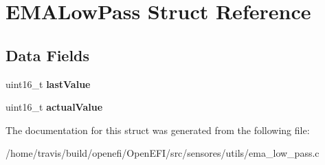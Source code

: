 \hypertarget{structEMALowPass}{}\section{E\+M\+A\+Low\+Pass Struct Reference}
\label{structEMALowPass}
\subsection*{Data Fields}
\begin{DoxyCompactItemize}
\item 
uint16\+\_\+t {\bfseries last\+Value}\hypertarget{structEMALowPass_a73f50a2d936f1cb4f1fbdd7e71fce863}{}\label{structEMALowPass_a73f50a2d936f1cb4f1fbdd7e71fce863}

\item 
uint16\+\_\+t {\bfseries actual\+Value}\hypertarget{structEMALowPass_a7747b0ecc32c8720e49bb2ca9247735b}{}\label{structEMALowPass_a7747b0ecc32c8720e49bb2ca9247735b}

\end{DoxyCompactItemize}


The documentation for this struct was generated from the following file\+:\begin{DoxyCompactItemize}
\item 
/home/travis/build/openefi/\+Open\+E\+F\+I/src/sensores/utils/ema\+\_\+low\+\_\+pass.\+c\end{DoxyCompactItemize}
